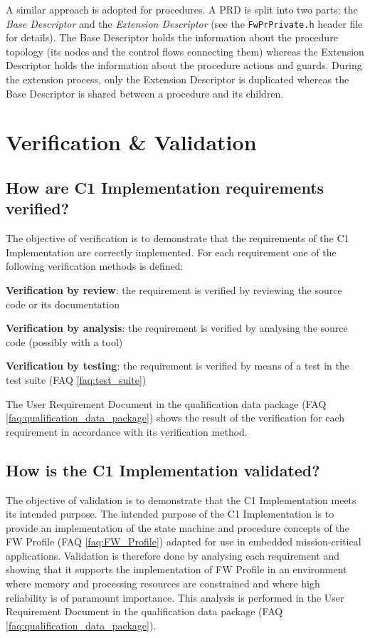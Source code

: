 \documentclass[a4paper,10pt]{article}
\let\stdsection\section
\renewcommand\section{\newpage\stdsection}
\newenvironment{fw_itemize}						%
{\begin{itemize}
  \setlength{\itemsep}{1mm}
  \setlength{\parskip}{0pt}
  \setlength{\parsep}{0pt}}
{\end{itemize}}
\begin{document}
A similar approach is adopted for procedures. A PRD is split into two parts: the \emph{Base Descriptor} and the \emph{Extension Descriptor} 
(see the \texttt{FwPrPrivate.h} header file for details). The Base Descriptor holds the information about the procedure topology (its nodes and 
the control flows connecting them) whereas the Extension Descriptor holds the information about the procedure actions and guards. 
During the extension process, only the Extension Descriptor is duplicated whereas the Base Descriptor is shared between a procedure and its children.

\section{Verification \& Validation}

\subsection{How are C1 Implementation requirements verified?}
The objective of verification is to demonstrate that the requirements of the C1 Implementation are correctly implemented. For each requirement 
one of the following verification methods is defined:

\begin{fw_itemize} 
\item \textbf{Verification by review}: the requirement is verified by reviewing the source code or its documentation
\item \textbf{Verification by analysis}: the requirement is verified by analysing the source code (possibly with a tool)
\item \textbf{Verification by testing}: the requirement is verified by means of a test in the test suite (FAQ \ref{faq:test_suite})
\end{fw_itemize}

The User Requirement Document in the qualification data package (FAQ \ref{faq:qualification_data_package}) shows 
the result of the verification for each requirement in accordance with its verification method. 

\subsection{How is the C1 Implementation validated?}
The objective of validation is to demonstrate that the C1 Implementation meets its intended purpose. The intended purpose of the C1 Implementation 
is to provide an implementation of the state machine and procedure concepts of the FW Profile (FAQ \ref{faq:FW_Profile}) adapted for use in 
embedded mission-critical applications. Validation is therefore done by analysing each requirement and showing that it supports the implementation 
of FW Profile in an environment where memory and processing resources are constrained and where high reliability is of paramount importance. 
This analysis is performed in the User Requirement Document in the qualification data package (FAQ \ref{faq:qualification_data_package}).
\end{document}
